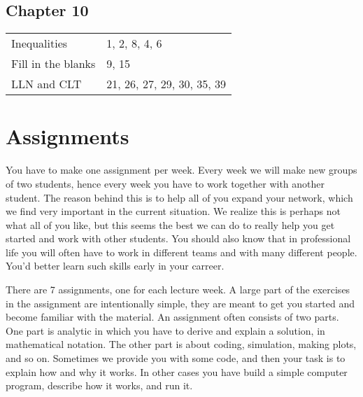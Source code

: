 \documentclass[a4paper]{article}
\theoremstyle{definition}
\newcommand{\1}[1]{\,I_{#1}} %
\begin{document}
\subsection{Chapter 10}
\label{sec:org7bf7d00}
\begin{center}
\begin{tabular}{ll}
\hline
Inequalities & 1, 2, 8, 4, 6\\
Fill in the blanks & 9, 15\\
LLN and CLT & 21, 26, 27, 29, 30, 35, 39\\
\hline
\end{tabular}
\end{center}


\section{Assignments}
\label{sec:org03665a2}
You have to make one assignment per week.
Every week we will make new groups of two students, hence every week you have to work together with another student.
The reason behind this is to help all of you expand your network, which we find very important in the current situation.
We realize this is perhaps not what all of you like, but this seems the best we can do to really help you get started and work with other students.
You should also know that in professional life you will often have to work in different teams and with many different people.
You'd better learn such skills early in your carreer.

There are 7 assignments, one for each lecture week.
A large part of the exercises in the assignment are intentionally simple, they are meant to get you started and become familiar with the material.
An assignment often consists of two parts.
One part is analytic in which you have to derive and explain a solution, in mathematical notation.
The other part is about coding, simulation, making plots, and so on.
Sometimes  we provide you with some code, and then your task is to explain how and why it works.
In other cases you have build a simple computer program, describe how it works, and run it.
\end{document}
